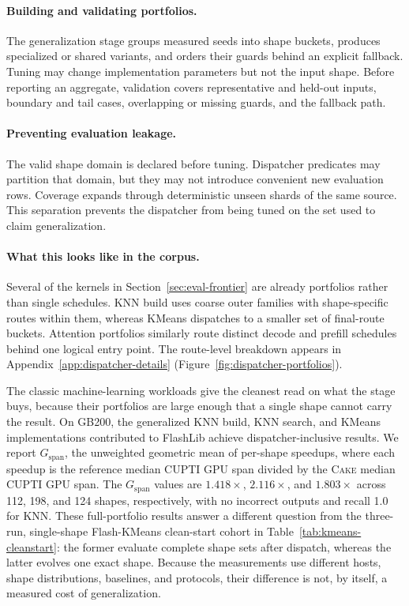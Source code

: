 \documentclass[11pt]{article}
\newcommand{\cake}{\textsc{Cake}}
\begin{document}
\paragraph{Building and validating portfolios.}
The generalization stage groups measured seeds into shape buckets, produces
specialized or shared variants, and orders their guards behind an explicit
fallback. Tuning may change implementation parameters but not the input shape.
Before reporting an aggregate, validation covers representative and held-out
inputs, boundary and tail cases, overlapping or missing guards, and the
fallback path.

\paragraph{Preventing evaluation leakage.}
The valid shape domain is declared before tuning. Dispatcher predicates may
partition that domain, but they may not introduce convenient new evaluation
rows. Coverage expands through deterministic unseen shards of the same source.
This separation prevents the dispatcher from being tuned on the set used to
claim generalization.

\paragraph{What this looks like in the corpus.}
Several of the kernels in Section~\ref{sec:eval-frontier} are already portfolios
rather than single schedules. KNN build uses coarse outer families with
shape-specific routes within them, whereas KMeans dispatches to a smaller set of
final-route buckets. Attention portfolios similarly route distinct decode and
prefill schedules behind one logical entry point. The route-level breakdown
appears in Appendix~\ref{app:dispatcher-details}
(Figure~\ref{fig:dispatcher-portfolios}).

The classic machine-learning workloads give the cleanest read on what the stage
buys, because their portfolios are large enough that a single shape cannot carry
the result. On GB200, the generalized KNN build, KNN search, and KMeans
implementations contributed to FlashLib achieve dispatcher-inclusive results.
We report $G_{\mathrm{span}}$, the unweighted geometric mean of per-shape
speedups, where each speedup is the reference median CUPTI GPU span divided by
the \cake{} median CUPTI GPU span. The $G_{\mathrm{span}}$ values are
$1.418\times$, $2.116\times$, and $1.803\times$ across 112, 198, and 124 shapes,
respectively, with no incorrect outputs and recall 1.0 for KNN. These
full-portfolio results answer a different question from the three-run,
single-shape Flash-KMeans clean-start cohort in
Table~\ref{tab:kmeans-cleanstart}: the former evaluate complete shape sets after
dispatch, whereas the latter evolves one exact shape. Because the measurements use
different hosts, shape distributions, baselines, and protocols, their difference
is not, by itself, a measured cost of generalization.
\end{document}
